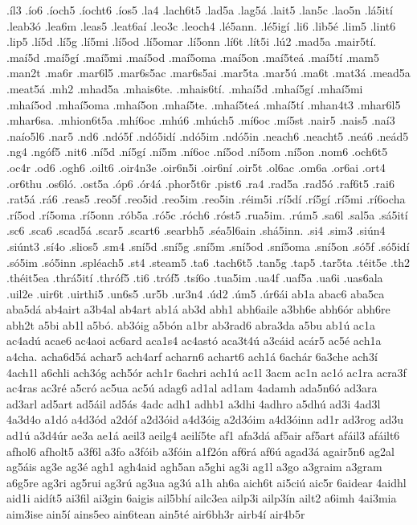 {.íl3
.ío6
.íoch5
.íocht6
.íos5
.la4
.lach6t5
.lad5a
.lag5á
.lait5
.lan5c
.lao5n
.lá5ití
.leab3ó
.lea6m
.leas5
.leat6aí
.leo3c
.leoch4
.lé5ann.
.lé5igí
.li6
.lib5é
.lim5
.lint6
.lip5
.lí5d
.lí5g
.lí5mi
.lí5od
.lí5omar
.lí5onn
.lí6t
.lít5i
.lú2
.mad5a
.mair5tí.
.maí5d
.maí5gí
.maí5mi
.maí5od
.maí5oma
.maí5on
.maí5teá
.maí5tí
.mam5
.man2t
.ma6r
.mar6l5
.mar6s5ac
.mar6s5ai
.mar5ta
.mar5ú
.ma6t
.mat3á
.mead5a
.meat5á
.mh2
.mhad5a
.mhais6te.
.mhais6tí.
.mhaí5d
.mhaí5gí
.mhaí5mi
.mhaí5od
.mhaí5oma
.mhaí5on
.mhaí5te.
.mhaí5teá
.mhaí5tí
.mhan4t3
.mhar6l5
.mhar6sa.
.mhion6t5a
.mhí6oc
.mhú6
.mhúch5
.mí6oc
.mí5st
.nair5
.nais5
.naí3
.naío5l6
.nar5
.nd6
.ndó5f
.ndó5idí
.ndó5im
.ndó5in
.neach6
.neacht5
.neá6
.neád5
.ng4
.ngóf5
.nit6
.ní5d
.ní5gí
.ní5m
.ní6oc
.ní5od
.ní5om
.ní5on
.nom6
.och6t5
.oc4r
.od6
.ogh6
.oilt6
.oir4n3e
.oir6n5i
.oir6ní
.oir5t
.ol6ac
.om6a
.or6ai
.ort4
.or6thu
.os6ló.
.ost5a
.óp6
.ór4á
.phor5t6r
.pist6
.ra4
.rad5a
.rad5ó
.raf6t5
.rai6
.rat5á
.rá6
.reas5
.reo5f
.reo5id
.reo5im
.reo5in
.réim5i
.rí5dí
.rí5gí
.rí5mi
.rí6ocha
.rí5od
.rí5oma
.rí5onn
.rób5a
.ró5c
.róch6
.róst5
.rua5im.
.rúm5
.sa6l
.sal5a
.sá5ití
.sc6
.sca6
.scad5á
.scar5
.scart6
.searbh5
.séa5l6ain
.shá5inn.
.si4
.sim3
.siún4
.siúnt3
.sí4o
.slios5
.sm4
.sní5d
.sní5g
.sní5m
.sní5od
.sní5oma
.sní5on
.só5f
.só5idí
.só5im
.só5inn
.spléach5
.st4
.steam5
.ta6
.tach6t5
.tan5g
.tap5
.tar5ta
.téit5e
.th2
.théit5ea
.thrá5ití
.thróf5
.ti6
.tróf5
.tsí6o
.tua5im
.ua4f
.uaf5a
.ua6i
.uas6ala
.uil2e
.uir6t
.uirthi5
.un6s5
.ur5b
.ur3n4
.úd2
.úm5
.úr6ái
ab1a
abac6
aba5ca
aba5dá
ab4airt
a3b4al
ab4art
ab1á
ab3d
abh1
abh6aile
a3bh6e
abh6ór
abh6re
abh2t
a5bi
ab1l
a5bó.
ab3óig
a5bón
a1br
ab3rad6
abra3da
a5bu
ab1ú
ac1a
ac4adú
acae6
ac4aoi
ac6ard
aca1s4
ac4astó
aca3t4ú
a3cáid
acár5
ac5é
ach1a
a4cha.
acha6d5á
achar5
ach4arf
acharn6
achart6
ach1á
6achár
6a3che
ach3í
4ach1l
a6chli
ach3óg
ach5ór
ach1r
6achri
ach1ú
ac1l
3acm
ac1n
ac1ó
ac1ra
acra3f
ac4ras
ac3ré
a5cró
ac5ua
ac5ú
adag6
ad1al
ad1am
4adamh
ada5n6ó
ad3ara
ad3arl
ad5art
ad5áil
ad5ás
4adc
adh1
adhb1
a3dhi
4adhro
a5dhú
ad3i
4ad3l
4a3d4o
a1dó
a4d3ód
a2dóf
a2d3óid
a4d3óig
a2d3óim
a4d3óinn
ad1r
ad3rog
ad3u
ad1ú
a3d4úr
ae3a
ae1á
aeil3
aeilg4
aeilí5te
af1
afa3dá
af5air
af5art
afáil3
afáilt6
afhol6
afholt5
a3f6l
a3fo
a3fóib
a3fóin
a1f2ón
af6rá
af6ú
agad3á
agair5n6
ag2al
ag5áis
ag3e
ag3é
agh1
agh4aid
agh5an
a5ghi
ag3i
ag1l
a3go
a3graim
a3gram
a6g5re
ag3ri
ag5rui
ag3rú
ag3ua
ag3ú
a1h
ah6a
aich6t
ai5ciú
aic5r
6aidear
4aidhl
aid1i
aidít5
ai3fil
ai3gin
6aigis
ail5bhí
ailc3ea
ailp3i
ailp3ín
ailt2
a6imh
4ai3mia
aim3ise
ain5í
ains5eo
ain6tean
ain5té
air6bh3r
airb4í
air4b5r
}
